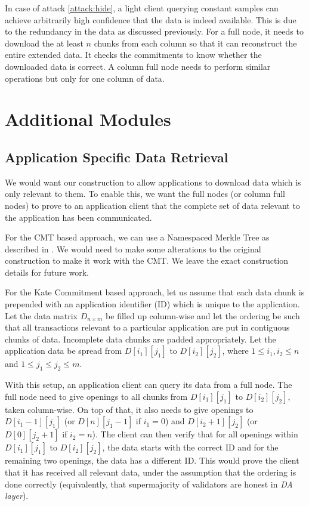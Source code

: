 \documentclass[sigconf, screen=true, nonacm]{acmart}
\newcommand{\DA}{\textit{DA layer}}
\begin{document}
        In case of attack \ref{attack:hide}, a light client querying constant samples can achieve arbitrarily high confidence that the data is indeed available. This is due to the redundancy in the data as discussed previously. For a full node, it needs to download the at least $n$ chunks from each column so that it can reconstruct the entire extended data. It checks the commitments to know whether the downloaded data is correct. A column full node needs to perform similar operations but only for one column of data. 

\section{Additional Modules}
    \subsection{Application Specific Data Retrieval}
        We would want our construction to allow applications to download data which is only relevant to them. To enable this, we want the full nodes (or column full nodes) to prove to an application client that the complete set of data relevant to the application has been communicated.

        
        For the CMT based approach, we can use a Namespaced Merkle Tree as described in \cite{lazyledger}. We would need to make some alterations to the original construction to make it work with the CMT. We leave the exact construction details for future work. 

        For the Kate Commitment based approach, let us assume that each data chunk is prepended with an application identifier (ID) which is unique to the application. 
        Let the data matrix $D_{n \times m}$ be filled up column-wise and let the ordering be such that all transactions relevant to a particular application are put in contiguous chunks of data. Incomplete data chunks are padded appropriately. Let the application data be spread from $D[i_1][j_1]$ to $D[i_2][j_2]$, where $1 \leq i_1, i_2 \leq n$ and $1 \leq j_1 \leq j_2 \leq m$.   

        With this setup, an application client can query its data from a full node. The full node need to give openings to all chunks from $D[i_1][j_1]$ to $D[i_2][j_2]$, taken column-wise. On top of that, it also needs to give openings to $D[i_1-1][j_1]$ (or $D[n][j_1-1]$ if $i_1=0$) and $D[i_2+1][j_2]$ (or $D[0][j_2+1]$ if $i_2=n$). The client can then verify that for all openings within $D[i_1][j_1]$ to $D[i_2][j_2]$, the data starts with the correct ID and for the remaining two openings, the data has a different ID. This would prove the client that it has received all relevant data, under the assumption that the ordering is done correctly (equivalently, that supermajority of validators are honest in \DA). 
\end{document}
